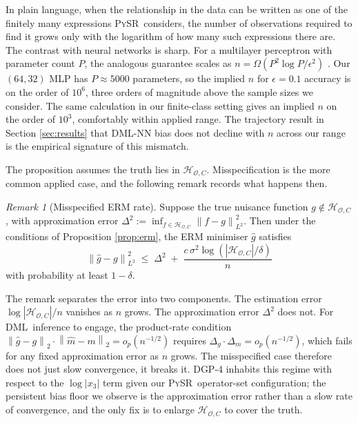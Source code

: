\documentclass[11pt, a4paper]{article}
\theoremstyle{plain}
\theoremstyle{definition}
\theoremstyle{remark}
\newtheorem{remark}[theorem]{Remark}
\newcommand{\dml}{\textsc{DML}}
\newcommand{\pysr}{\textsc{PySR}}
\newcommand{\norm}[1]{\left\lVert #1 \right\rVert}
\newcommand{\Hcal}{\mathcal{H}_{\mathcal{O}, C}}
\begin{document}
In plain language, when the relationship in the data can be
written as one of the finitely many expressions \pysr\
considers, the number of observations required to find it grows
only with the logarithm of how many such expressions there are.
The contrast with neural networks is sharp. For a multilayer
perceptron with parameter count $P$, the analogous guarantee
scales as $n = \Omega(P^2 \log P / \epsilon^2)$
\citep{anthony2009neural}. Our $(64, 32)$ MLP has $P \approx
5000$ parameters, so the implied $n$ for $\epsilon = 0.1$
accuracy is on the order of $10^6$, three orders of magnitude
above the sample sizes we consider. The same calculation in our
finite-class setting gives an implied $n$ on the order of
$10^3$, comfortably within applied range. The trajectory result
in Section \ref{sec:results} that \dml-NN bias does not decline
with $n$ across our range is the empirical signature of this
mismatch.

The proposition assumes the truth lies in $\Hcal$.
Misspecification is the more common applied case, and the
following remark records what happens then.

\begin{remark}[Misspecified ERM rate]
\label{rem:misspec}
Suppose the true nuisance function $g \notin \Hcal$, with
approximation error
$\Delta^2 := \inf_{f \in \Hcal} \norm{f - g}^2_{L^2}$.
Then under the conditions of Proposition \ref{prop:erm}, the
ERM minimiser $\hat{g}$ satisfies
\begin{equation*}
    \norm{\hat{g} - g}^2_{L^2}
    \;\leq\;
    \Delta^2 \;+\; \frac{c \, \sigma^2 \log(|\Hcal|/\delta)}{n}
\end{equation*}
with probability at least $1-\delta$.
\end{remark}

The remark separates the error into two components. The
estimation error $\log|\Hcal|/n$ vanishes as $n$ grows. The
approximation error $\Delta^2$ does not. For \dml\ inference
to engage, the product-rate condition $\norm{\hat{g} - g}_2
\cdot \norm{\hat{m} - m}_2 = o_p(n^{-1/2})$ requires
$\Delta_g \cdot \Delta_m = o_p(n^{-1/2})$, which fails for any
fixed approximation error as $n$ grows. The misspecified case
therefore does not just slow convergence, it breaks it. DGP-4
inhabits this regime with respect to the $\log|x_3|$ term given
our \pysr\ operator-set configuration; the persistent bias floor
we observe is the approximation error rather than a slow rate
of convergence, and the only fix is to enlarge $\Hcal$ to cover
the truth.
\end{document}
